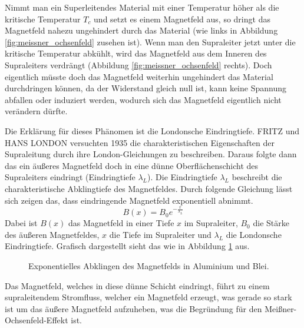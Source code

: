 Nimmt man ein Superleitendes Material mit einer Temperatur höher als die kritische Temperatur $T_c$
und setzt es einem Magnetfeld aus, so dringt das Magnetfeld nahezu ungehindert durch das Material (wie links in Abbildung \ref{fig:meissner_ochsenfeld} zusehen ist). 
Wenn man den Supraleiter jetzt unter die kritische Temperatur abkühlt, wird das Magnetfeld aus dem Inneren des Supraleiters verdrängt (Abbildung \ref{fig:meissner_ochsenfeld} rechts).
Doch eigentlich müsste doch das Magnetfeld weiterhin ungehindert das Material durchdringen können, da der 
Widerstand gleich null ist, kann keine Spannung abfallen oder induziert werden, wodurch sich das Magnetfeld 
eigentlich nicht verändern dürfte.

Die Erklärung für dieses Phänomen ist die Londonsche Eindringtiefe. FRITZ und HANS LONDON
versuchten 1935 die charakteristischen Eigenschaften der Supraleitung durch ihre London-Gleichungen 
zu beschreiben. Daraus folgte dann das ein äußeres Magnetfeld doch in eine dünne Oberflächenschicht des Supraleiters eindringt (Eindringtiefe $\lambda_L$).
Die Eindringtiefe $\lambda_L$ beschreibt die charakteristische Abklingtiefe des Magnetfeldes.
Durch folgende Gleichung lässt sich zeigen das, dass eindringende Magnetfeld exponentiell abnimmt.
\begin{equation}
    B(x) = B_0 e^{-\frac{x}{\lambda_L}}
\end{equation}
Dabei ist $B(x)$ das Magnetfeld in einer Tiefe $x$ im Supraleiter, $B_0$ die Stärke des äußeren Magnetfeldes, $x$ die Tiefe im Supraleiter und $\lambda_L$ die Londonsche Eindringtiefe.
Grafisch dargestellt sieht das wie in Abbildung \ref{fig:magnetfeld_abklingen} aus.
\begin{figure}[!ht]
    \centering
    \caption{Exponentielles Abklingen des Magnetfelds in Aluminium und Blei.}
    \label{fig:magnetfeld_abklingen}
\end{figure}

Das Magnetfeld, welches in diese dünne Schicht eindringt, führt zu einem supraleitendem Stromfluss, welcher ein 
Magnetfeld erzeugt, was gerade so stark ist um das äußere Magnetfeld aufzuheben, was 
die Begründung für den Meißner-Ochsenfeld-Effekt ist. 

